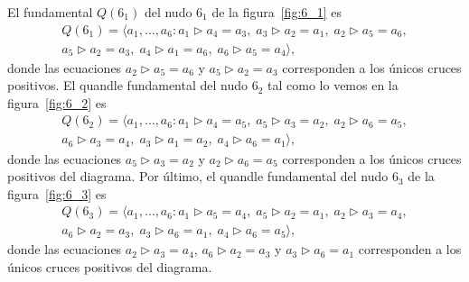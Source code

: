 \documentclass[graybox]{svmult}
\begin{document}
	\label{block:Q(6_1):fundamental_quandle}
	\label{block:Q(6_2):fundamental_quandle}
	\label{block:Q(6_3):fundamental_quandle}
    El fundamental $Q(6_1)$ del nudo $6_1$ de la figura~\ref{fig:6_1} es
	\begin{multline}
		Q(6_1)=\langle a_1,\dots,a_6:
		a_1\triangleright a_4=a_3,\;
		a_3\triangleright a_2=a_1,\;
		a_2\triangleright a_5=a_6,\\
		a_5\triangleright a_2=a_3,\;
		a_4\triangleright a_1=a_6,\;
		a_6\triangleright a_5=a_4\rangle,
	\end{multline}
    donde las ecuaciones $a_2\triangleright a_5=a_6$ y $a_5\triangleright
    a_2=a_3$ corresponden a los únicos cruces positivos. 
    El quandle fundamental del nudo $6_2$ tal como lo vemos en la
    figura~\ref{fig:6_2} es
	\begin{multline}
		Q(6_2)=\langle a_1,\dots,a_6:
		a_1\triangleright a_4=a_5,\;
		a_5\triangleright a_3=a_2,\;
		a_2\triangleright a_6=a_5,\\
		a_6\triangleright a_3=a_4,\;
		a_3\triangleright a_1=a_2,\;
		a_4\triangleright a_6=a_1\rangle,
	\end{multline}
    donde las ecuaciones $a_5\triangleright a_3=a_2$ y $a_2\triangleright
    a_6=a_5$ corresponden a los únicos cruces positivos del diagrama.  
    Por último, el quandle fundamental del nudo $6_3$ de la figura~\ref{fig:6_3} es 
	\begin{multline}
		\label{eq:Q(6_3)}
		Q(6_3)=\langle a_1,\dots,a_6:
			a_1\triangleright a_5=a_4,\;
			a_5\triangleright a_2=a_1,\;
			a_2\triangleright a_3=a_4,\\
			a_6\triangleright a_2=a_3,\;
			a_3\triangleright a_6=a_1,\;
			a_4\triangleright a_6=a_5\rangle,
	\end{multline}
    donde las ecuaciones $a_2\triangleright a_3=a_4$, $a_6\triangleright
    a_2=a_3$ y $a_3\triangleright a_6=a_1$ corresponden a los únicos cruces
    positivos del diagrama. 
\end{document}
